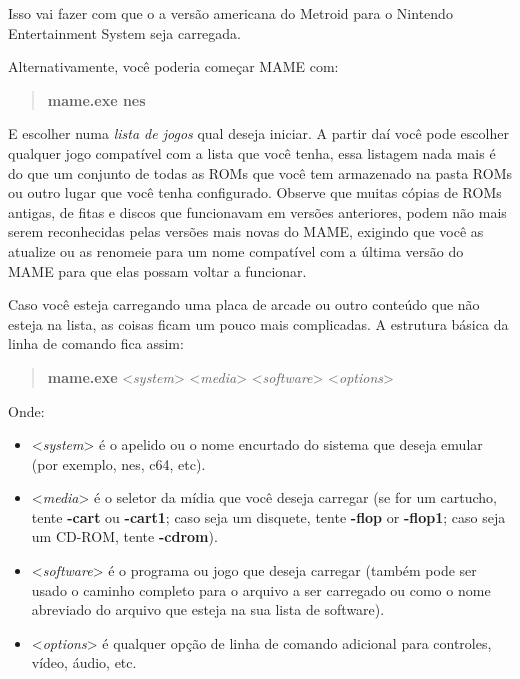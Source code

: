 \documentclass[letterpaper,10pt,brazil]{sphinxmanual}
\begin{document}
Isso vai fazer com que o a versão americana do Metroid para o Nintendo
Entertainment System seja carregada.

Alternativamente, você poderia começar MAME com:
\begin{quote}

\textbf{mame.exe nes}
\end{quote}

E escolher numa \emph{lista de jogos} qual deseja iniciar. A partir daí
você pode escolher qualquer jogo compatível com a lista que você tenha,
essa listagem nada mais é do que um conjunto de todas as ROMs que você
tem armazenado na pasta ROMs ou outro lugar que você tenha configurado.
Observe que muitas cópias de ROMs antigas, de fitas e discos que
funcionavam em versões anteriores, podem não mais serem reconhecidas
pelas versões mais novas do MAME, exigindo que você as atualize ou as
renomeie para um nome compatível com a última versão do MAME para que
elas possam voltar a funcionar.

Caso você esteja carregando uma placa de arcade ou outro conteúdo que
não esteja na lista, as coisas ficam um pouco mais complicadas.
\clearpage
A estrutura básica da linha de comando fica assim:
\begin{quote}

\textbf{mame.exe} \textless{}\emph{system}\textgreater{} \textless{}\emph{media}\textgreater{} \textless{}\emph{software}\textgreater{} \textless{}\emph{options}\textgreater{}
\end{quote}

Onde:
\begin{itemize}
\item {} 
\textless{}\emph{system}\textgreater{} é o apelido ou o nome encurtado do sistema que deseja
emular (por exemplo, nes, c64, etc).

\item {} 
\textless{}\emph{media}\textgreater{} é o seletor da mídia que você deseja carregar (se for um
cartucho, tente \textbf{-cart} ou \textbf{-cart1}; caso seja um disquete,
tente \textbf{-flop} or \textbf{-flop1}; caso seja um CD-ROM, tente
\textbf{-cdrom}).

\item {} 
\textless{}\emph{software}\textgreater{} é o programa ou jogo que deseja carregar (também pode
ser usado o caminho completo para o arquivo a ser carregado ou como
o nome abreviado do arquivo que esteja na sua lista de software).

\item {} 
\textless{}\emph{options}\textgreater{} é qualquer opção de linha de comando adicional para
controles, vídeo, áudio, etc.

\end{itemize}
\end{document}
